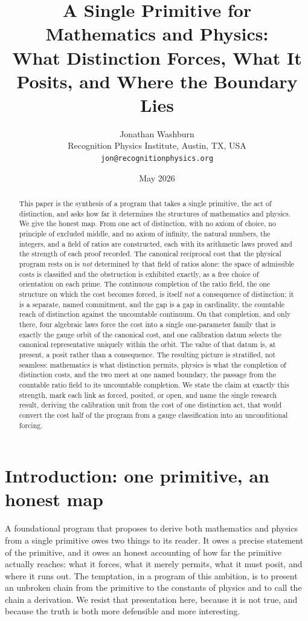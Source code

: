 \documentclass[11pt,a4paper]{article}
\title{%
  A Single Primitive for Mathematics and Physics:\\
  What Distinction Forces, What It Posits, and Where the Boundary Lies}
\author{%
  Jonathan Washburn\\
  Recognition Physics Institute, Austin, TX, USA\\
  \texttt{jon@recognitionphysics.org}}
\date{May 2026}
\theoremstyle{definition}
\theoremstyle{remark}
\begin{document}
\maketitle

\begin{abstract}\sloppy
This paper is the synthesis of a program that takes a single primitive, the act
of distinction, and asks how far it determines the structures of mathematics and
physics. We give the honest map. From one act of distinction, with no axiom of
choice, no principle of excluded middle, and no axiom of infinity, the natural
numbers, the integers, and a field of ratios are constructed, each with its
arithmetic laws proved and the strength of each proof recorded. The canonical
reciprocal cost that the physical program rests on is \emph{not} determined by
that field of ratios alone: the space of admissible costs is classified and the
obstruction is exhibited exactly, as a free choice of orientation on each prime.
The continuous completion of the ratio field, the one structure on which the cost
becomes forced, is itself \emph{not} a consequence of distinction; it is a
separate, named commitment, and the gap is a gap in cardinality, the countable
reach of distinction against the uncountable continuum. On that completion, and
only there, four algebraic laws force the cost into a single one-parameter family
that is exactly the gauge orbit of the canonical cost, and one calibration datum
selects the canonical representative uniquely within the orbit. The value of that
datum is, at present, a posit rather than a consequence. The resulting picture is
stratified, not seamless: mathematics is what distinction permits, physics is
what the completion of distinction costs, and the two meet at one named boundary,
the passage from the countable ratio field to its uncountable completion. We state
the claim at exactly this strength, mark each link as forced, posited, or open,
and name the single research result, deriving the calibration unit from the cost
of one distinction act, that would convert the cost half of the program from a
gauge classification into an unconditional forcing.
\end{abstract}

\tableofcontents

\section{Introduction: one primitive, an honest map}

A foundational program that proposes to derive both mathematics and physics from a
single primitive owes two things to its reader. It owes a precise statement of the
primitive, and it owes an honest accounting of how far the primitive actually
reaches: what it forces, what it merely permits, what it must posit, and where it
runs out. The temptation, in a program of this ambition, is to present an
unbroken chain from the primitive to the constants of physics and to call the
chain a derivation. We resist that presentation here, because it is not true, and
because the truth is both more defensible and more interesting.
\end{document}
